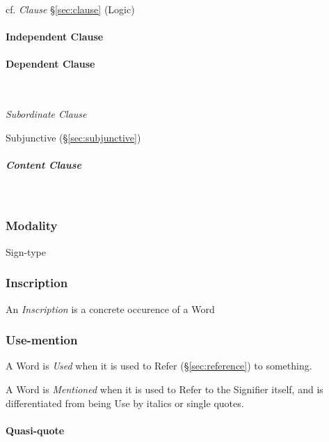cf. \emph{Clause} \S\ref{sec:clause} (Logic)



\paragraph{Independent Clause}\label{sec:independent_clause}\hfill

\paragraph{Dependent Clause}\label{sec:dependent_clause}\hfill \\\hfill

\emph{Subordinate Clause}

Subjunctive (\S\ref{sec:subjunctive})

\subparagraph{Content Clause}\label{sec:content_clause}\hfill \\\hfill



\subsubsection{Modality}\label{sec:syntax_modality}

Sign-type




\subsubsection{Inscription}\label{sec:inscription}

An \emph{Inscription} is a concrete occurence of a Word



\subsubsection{Use-mention}\label{sec:use_mention}

A Word is \emph{Used} when it is used to Refer (\S\ref{sec:reference})
to something.

A Word is \emph{Mentioned} when it is used to Refer to the Signifier
itself, and is differentiated from being Use by italics or single
quotes.



\paragraph{Quasi-quote}\label{sec:quasi_quote}\hfill

